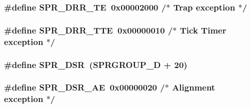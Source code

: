 \hypertarget{spr-defs_8h_a0af878c7d21873d9f07ba68b6407c518}{
\subsubsection[{\-S\-P\-R\-\_\-\-D\-R\-R\-\_\-\-T\-E}]{\setlength{\rightskip}{0pt plus 5cm}\#define {\bf \-S\-P\-R\-\_\-\-D\-R\-R\-\_\-\-T\-E}~0x00002000  /$\ast$ Trap exception $\ast$/}}\label{spr-defs_8h_a0af878c7d21873d9f07ba68b6407c518}
\hypertarget{spr-defs_8h_a2e5b15c93d9551f7c9560beb1b150388}{
\subsubsection[{\-S\-P\-R\-\_\-\-D\-R\-R\-\_\-\-T\-T\-E}]{\setlength{\rightskip}{0pt plus 5cm}\#define {\bf \-S\-P\-R\-\_\-\-D\-R\-R\-\_\-\-T\-T\-E}~0x00000010  /$\ast$ Tick Timer exception $\ast$/}}\label{spr-defs_8h_a2e5b15c93d9551f7c9560beb1b150388}
\hypertarget{spr-defs_8h_af3fd6e3b3f8931ed6194817864f59127}{
\subsubsection[{\-S\-P\-R\-\_\-\-D\-S\-R}]{\setlength{\rightskip}{0pt plus 5cm}\#define {\bf \-S\-P\-R\-\_\-\-D\-S\-R}~({\bf \-S\-P\-R\-G\-R\-O\-U\-P\-\_\-\-D} + 20)}}\label{spr-defs_8h_af3fd6e3b3f8931ed6194817864f59127}
\hypertarget{spr-defs_8h_a7bace23dafc7e221f6fbc98a317afaf4}{
\subsubsection[{\-S\-P\-R\-\_\-\-D\-S\-R\-\_\-\-A\-E}]{\setlength{\rightskip}{0pt plus 5cm}\#define {\bf \-S\-P\-R\-\_\-\-D\-S\-R\-\_\-\-A\-E}~0x00000020  /$\ast$ Alignment exception $\ast$/}}\label{spr-defs_8h_a7bace23dafc7e221f6fbc98a317afaf4}
